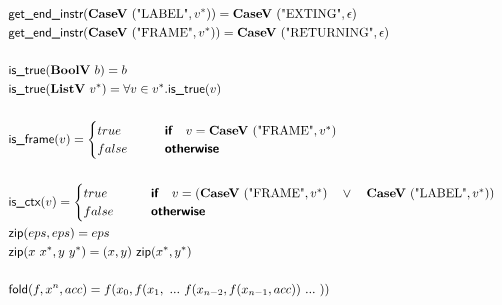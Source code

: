 \begin{align*}
%
\newline \\
  &\getendinstr(\casev ~ (\text{"LABEL"}, \seq v)) = \casev ~ (\text{"EXTING"}, \epsilon) \\
  &\getendinstr(\casev ~ (\text{"FRAME"}, \seq v)) = \casev ~ (\text{"RETURNING"}, \epsilon) \\
%
\newline \\
  &\istrue(\boolv ~ b) = b \\
  &\istrue(\listv ~ \seq v) = \forall v \in \seq v. \istrue (v) \\
%
\newline \\
  &\isframe(v) =
  \begin{cases}
    true
    &\quad\quad\premise{if}\quad v = \casev ~ (\text{"FRAME"}, \seq v) \\
    false &\quad\quad\premise{otherwise}\\
  \end{cases}
  \\
%
\newline \\
  &\isctx(v) =
  \begin{cases}
    true
    &\quad\quad\premise{if}\quad v = (\casev ~ (\text{"FRAME"}, \seq v) \quad\lor\quad \casev ~ (\text{"LABEL"}, \seq v)) \\
    false &\quad\quad\premise{otherwise}\\
  \end{cases}
%
\newline \\
  &\zip(eps, eps) = eps \\
  &\zip(x ~ \seq{x}, y ~ \seq{y}) = (x, y) ~ \zip (\seq{x}, \seq{y}) \\
%
\newline \\
  &\fold(f, x^n, acc) = f(x_0, f(x_1, ~ ... ~ f(x_{n-2}, f(x_{n-1}, acc)) ~ ... ~ ))
\end{align*}





